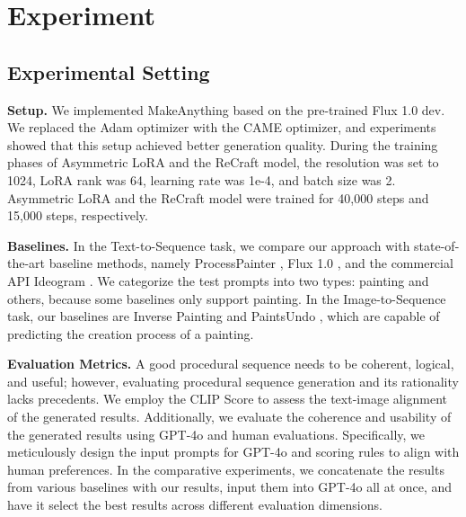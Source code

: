 
\section{Experiment}

\subsection{Experimental Setting}

\textbf{Setup.} We implemented MakeAnything based on the pre-trained Flux 1.0 dev. We replaced the Adam optimizer with the CAME optimizer, and experiments showed that this setup achieved better generation quality. During the training phases of Asymmetric LoRA and the ReCraft model, the resolution was set to 1024, LoRA rank was 64, learning rate was 1e-4, and batch size was 2. Asymmetric LoRA and the ReCraft model were trained for 40,000 steps and 15,000 steps, respectively.


\textbf{Baselines.} In the Text-to-Sequence task, we compare our approach with state-of-the-art baseline methods, namely ProcessPainter \cite{processpainter}, Flux 1.0 \cite{flux}, and the commercial API Ideogram \cite{ideogram}. We categorize the test prompts into two types: painting and others, because some baselines only support painting. In the Image-to-Sequence task, our baselines are Inverse Painting \cite{inverse} and PaintsUndo \cite{paintsundo}, which are capable of predicting the creation process of a painting.


\textbf{Evaluation Metrics.} A good procedural sequence needs to be coherent, logical, and useful; however, evaluating procedural sequence generation and its rationality lacks precedents. We employ the CLIP Score to assess the text-image alignment of the generated results. Additionally, we evaluate the coherence and usability of the generated results using GPT-4o and human evaluations. Specifically, we meticulously design the input prompts for GPT-4o and scoring rules to align with human preferences.  In the comparative experiments, we concatenate the results from various baselines with our results, input them into GPT-4o all at once, and have it select the best results across different evaluation dimensions.

